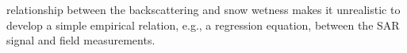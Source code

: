relationship between the backscattering and snow wetness makes it unrealistic to develop a simple empirical relation, e.g., a regression equation, between the SAR signal and field measurements. 

